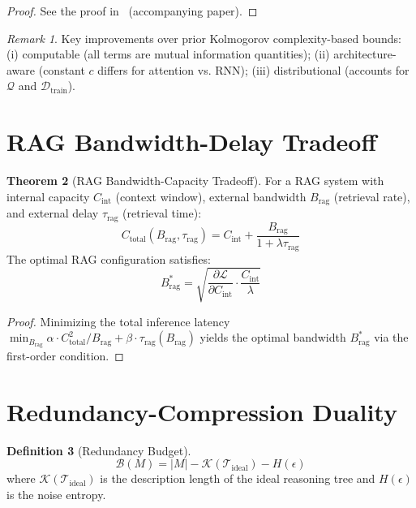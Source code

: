 \documentclass[12pt]{article}
\theoremstyle{definition}
\newtheorem{definition}{Definition}[section]
\newtheorem{theorem}[definition]{Theorem}
\theoremstyle{remark}
\newtheorem{remark}[definition]{Remark}
\begin{document}
\begin{proof}
See the proof in~\cite{lu2026-d30-2} (accompanying paper).
\end{proof}

\begin{remark}
Key improvements over prior Kolmogorov complexity-based bounds: (i) computable (all terms are mutual information quantities); (ii) architecture-aware (constant $c$ differs for attention vs. RNN); (iii) distributional (accounts for $\mathcal{Q}$ and $\mathcal{D}_{\mathrm{train}}$).
\end{remark}

\section{RAG Bandwidth-Delay Tradeoff}

\begin{theorem}[RAG Bandwidth-Capacity Tradeoff]\label{thm:rag-tradeoff}
For a RAG system with internal capacity $C_{\mathrm{int}}$ (context window), external bandwidth $B_{\mathrm{rag}}$ (retrieval rate), and external delay $\tau_{\mathrm{rag}}$ (retrieval time):
\begin{equation}
C_{\mathrm{total}}(B_{\mathrm{rag}}, \tau_{\mathrm{rag}}) = C_{\mathrm{int}} + \frac{B_{\mathrm{rag}}}{1 + \lambda \tau_{\mathrm{rag}}}
\end{equation}
The optimal RAG configuration satisfies:
\begin{equation}
B_{\mathrm{rag}}^* = \sqrt{\frac{\partial \mathcal{L}}{\partial C_{\mathrm{int}}} \cdot \frac{C_{\mathrm{int}}}{\lambda}}
\end{equation}
\end{theorem}

\begin{proof}
Minimizing the total inference latency $\min_{B_{\mathrm{rag}}} \alpha \cdot C_{\mathrm{total}}^2 / B_{\mathrm{rag}} + \beta \cdot \tau_{\mathrm{rag}}(B_{\mathrm{rag}})$ yields the optimal bandwidth $B_{\mathrm{rag}}^*$ via the first-order condition.
\end{proof}

\section{Redundancy-Compression Duality}

\begin{definition}[Redundancy Budget]
\begin{equation}
\mathcal{B}(M) = |M| - \mathcal{K}(\mathcal{T}_{\mathrm{ideal}}) - H(\epsilon)
\end{equation}
where $\mathcal{K}(\mathcal{T}_{\mathrm{ideal}})$ is the description length of the ideal reasoning tree and $H(\epsilon)$ is the noise entropy.
\end{definition}
\end{document}
